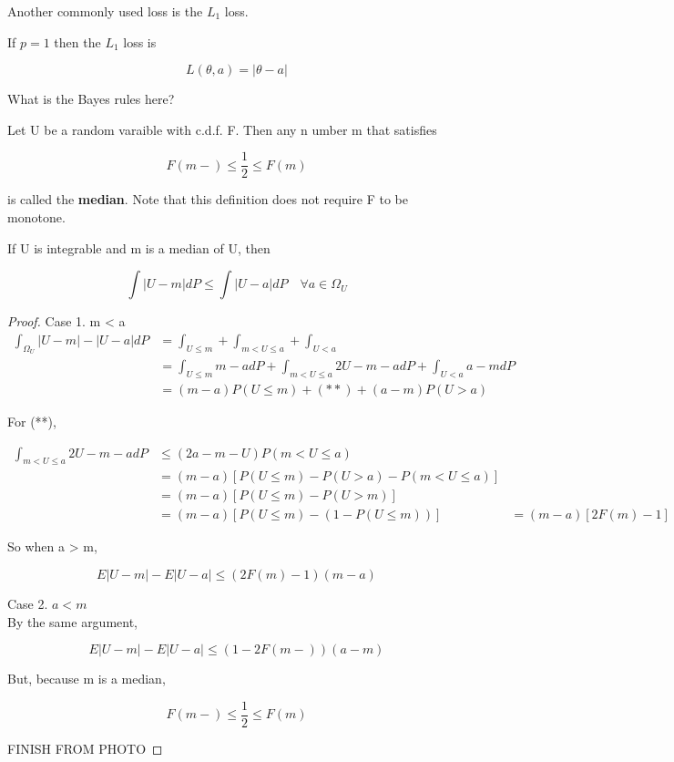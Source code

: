 \documentclass[11pt,fleqn]{book} %
\begin{document}
Another commonly used loss is the $L_1$ loss. 

\begin{definition}
	If $p = 1$ then the $L_1$ loss is 

			$$L(\theta, a) = |\theta - a| $$

What is the Bayes rules here?
\end{definition}

\begin{definition}[Median]
	Let  U be a random varaible with c.d.f. F. Then any n umber m that satisfies 

			$$F(m-) \leq \frac{1}{2} \leq F(m) $$

	is called the \textbf{median}. Note that this definition does not require F to be monotone. 
\end{definition}


\begin{theorem}
	If U is integrable and m is a median of U, then 

		$$\int |U- m | dP \leq \int |U - a| dP \quad \forall a \in \Omega_U $$ 
\end{theorem}



\begin{proof}
	Case 1. m < a\\

	\begin{align*}
		\int_{\Omega_U} |U-m| - |U-a|dP &= \int_{U \leq m} + \int_{m< U \leq a} + \int_{U < a}\\ 
			&= \int_{U \leq m} m-a dP+ \int_{m< U \leq a} 2U - m - a dP + \int_{U < a} a - m dP\\
			&= (m-a)P(U \leq m) + (**) + (a- m) P(U > a) 
	\end{align*}

	For (**), 

		\begin{align}
			\int_{m< U \leq a} 2U - m - a dP &\leq (2a - m - U) P(m < U \leq a)\\
			&= (m-a)[P(U \leq m) - P(U > a) - P(m < U \leq a)]\\
			&= (m-a)[P(U \leq m) - P(U> m)]\\
			&= (m-a)[P(U\leq m) - (1 - P(U \leq m))]
			&= (m - a) [2 F(m) - 1]
		\end{align}

		So when a > m, 

			$$E|U- m| - E|U- a| \leq (2 F(m) - 1)(m-a) $$

	Case 2. $a < m$\\

	By the same argument, 

			$$ E|U- m| - E|U- a| \leq (1 - 2 F(m-))(a- m) $$

	But, because m is a median, 

			$$ F(m-) \leq \frac{1}{2} \leq F(m)$$

			FINISH FROM PHOTO	
\end{proof}
\end{document}
